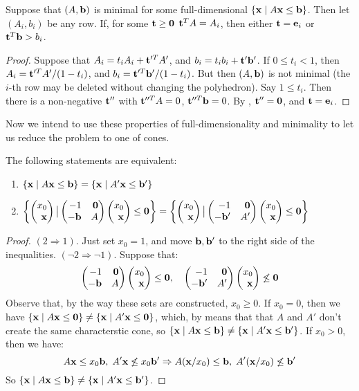 \begin{Prop}\label{ab_is_minimal}
	Suppose that $(A,\mathbf{b})$ is minimal for some full-dimensional $\left\{\mathbf{x}\;|\; A\mathbf{x}\leq \mathbf{b}\right\}$.  Then let $(A_i,b_i)$ be any row.  If, for some $\mathbf{t}\geq\mathbf{0}$ $\mathbf{t}^TA = A_i$, then either $\mathbf{t}=\mathbf{e}_i$ or $\mathbf{t}^T\mathbf{b} > b_i$.
\end{Prop}

\begin{proof}
	Suppose that $A_i = t_i A_i + \mathbf{t}'^T A'$, and $b_i = t_i b_i + \mathbf{t}'\mathbf{b}'$.  If $0 \leq t_i < 1$, then $A_i = \mathbf{t}'^T A'/(1-t_i)$, and $b_i = \mathbf{t}'^T \mathbf{b}'/(1-t_i)$.  But then $(A,\mathbf{b})$ is not minimal (the $i$-th row may be deleted without changing the polyhedron).  Say $1\leq t_i$.  Then there is a non-negative $\mathbf{t}''$ with $\mathbf{t}''^T A = 0$, $\mathbf{t}''^T\mathbf{b} = 0$.  By , $\mathbf{t}'' = \mathbf{0}$, and $\mathbf{t} = \mathbf{e}_i$.
\end{proof}

Now we intend to use these properties of full-dimensionality and minimality to let us reduce the problem to one of cones.

\begin{Prop}\label{homogenization_cone}
	The following statements are equivalent:
	\begin{enumerate}
		\item $\left\{\mathbf{x}\;|\; A\mathbf{x}\leq \mathbf{b}\right\} = \left\{\mathbf{x}\;|\; A'\mathbf{x}\leq \mathbf{b}'\right\}$
		\item $\set{\xx \big| \pmb -1 & \0 \\ -\b & A \pme \xx \leq \0} =
			      \set{\xx \big| \pmb -1 & \0 \\ -\b' & A' \pme \xx \leq \0}$
	\end{enumerate}
\end{Prop}

\begin{proof}
	$(2 \Rightarrow 1)$.  Just set $x_0 = 1$, and move $\mathbf{b},\mathbf{b}'$ to the right side of the inequalities.
	$(\neg 2 \Rightarrow \neg 1)$.  Suppose that:
	\[ \pmb -1 & \0 \\ -\b & A \pme \xx \leq \0,\quad
		\pmb -1 & \0 \\ -\b' & A' \pme \xx \not\leq \0 \]
	Observe that, by the way these sets are constructed, $x_0 \geq 0$.  If $x_0 = 0$, then we have $\left\{\mathbf{x}\;|\; A\mathbf{x}\leq\mathbf{0}\right\} \neq \left\{\mathbf{x}\;|\; A'\mathbf{x}\leq\mathbf{0}\right\}$, which, by  means that that $A$ and $A'$ don't create the same characterstic cone, so $\left\{\mathbf{x}\;|\; A\mathbf{x}\leq \mathbf{b}\right\} \neq \left\{\mathbf{x}\;|\; A'\mathbf{x}\leq \mathbf{b}'\right\}$.  If $x_0 > 0$, then we have:
	\[ A\mathbf{x} \leq x_0\mathbf{b},\;A'\mathbf{x}\not\leq x_0\mathbf{b}' \Rightarrow A(\mathbf{x}/x_0)\leq\mathbf{b},\;A'(\mathbf{x}/x_0)\not\leq\mathbf{b}' \]
	So $\left\{\mathbf{x}\;|\; A\mathbf{x}\leq \mathbf{b}\right\} \neq \left\{\mathbf{x}\;|\; A'\mathbf{x}\leq \mathbf{b}'\right\}$.
\end{proof}

